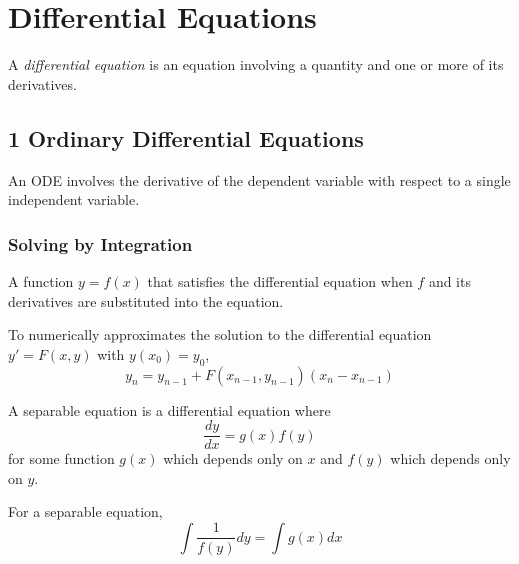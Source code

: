 \chapter{Differential Equations}

A \textit{differential equation} is an equation involving a quantity and one or more of its derivatives.

\section*{1 Ordinary Differential Equations}

An ODE involves the derivative of the dependent variable with respect to a single independent variable.

\subsection{Solving by Integration}

\begin{definition} A function $y = f(x)$ that satisfies the differential equation when $f$ and its derivatives are substituted into the equation.
\end{definition}

  

\begin{procedure} To numerically approximates the solution to the differential equation $y' = F(x, y)$ with $y(x_0) = y_0$,
  \[
    y_n = y_{n - 1} + F(x_{n-1}, y_{n - 1})(x_n - x_{n - 1})
  \]
\end{procedure}

\begin{definition} A separable equation is a differential equation where
  \[
    \frac{dy}{dx} = g(x)f(y)
  \]
  for some function $g(x)$ which depends only on $x$ and $f(y)$ which depends only on $y$.
\end{definition}

\begin{theorem} For a separable equation,
  \[
    \int \frac{1}{f(y)} dy = \int g(x) dx
  \]
\end{theorem}

